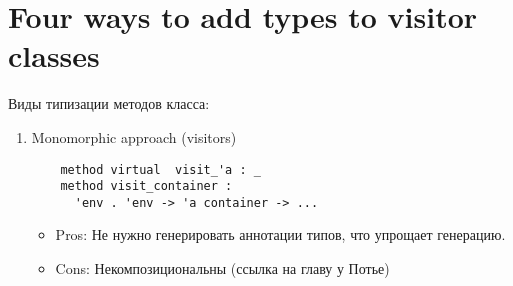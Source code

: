 \documentclass[acmsmall,review,anonymous]{acmart}\settopmatter{printfolios=true,printccs=false,printacmref=false}
\begin{document}
\section{Four ways to add types to visitor classes}
Виды типизации методов класса:
\begin{enumerate}

 \item Monomorphic approach (visitors)
    \begin{lstlisting}
    method virtual  visit_'a : _
    method visit_container :
      'env . 'env -> 'a container -> ...
    \end{lstlisting}
    \begin{itemize}
    \item Pros: Не нужно генерировать аннотации типов, что упрощает генерацию.
    \item Cons: Некомпозициональны (ссылка на главу у Потье)
    \end{itemize}
    

\end{enumerate}
\end{document}
